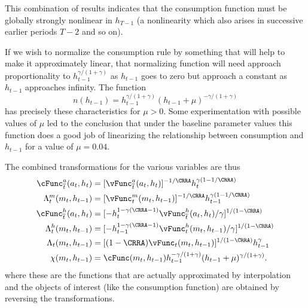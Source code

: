 \documentclass[titlepage, headings=optiontotocandhead]{\econtex}
\begin{document}
{  This combination of results indicates that the consumption function
  must be globally strongly nonlinear in $h_{T-1}$ (a nonlinearity which
  also arises in successive earlier periods $T-2$ and so on).

  If we wish to normalize the consumption rule by something that will
  help to make it approximately linear, that normalizing function will
  need approach proportionality to $h_{t-1}^{\gamma/(1+\gamma)}$ as
  $h_{t-1}$ goes to zero but approach a constant as $h_{t-1}$ approaches
  infinity.  The function
  \begin{equation}
    n(h_{t-1}) =
    h_{t-1}^{\gamma/(1+\gamma)}(h_{t-1}+\mu)^{-\gamma/(1+\gamma)}
  \end{equation}
  has precisely these characteristics for $\mu>0$.  Some
  experimentation with possible values of $\mu$ led to the conclusion
  that under the baseline parameter values this function does a good job
  of linearizing the relationship between consumption and $h_{t-1}$ for
  a value of $\mu = 0.04$.

  The combined transformations for the various variables are thus
  \begin{equation}\begin{gathered}\begin{aligned}
        \cFunc_{\overline{t}}^{{a}}({a}_{t},h_{t})        & = [\vEOPt^{{a}}({a}_{t},h_{t})]^{-1/\CRRA} h_{t}^{\gamma(1-1/\CRRA)} \label{eq:vEndstransform} \\
        \Lambda_{t}^{m}({m}_{t},h_{t-1})   & = [{\vFunc}_{t}^{m}({m}_{t},h_{t-1})]^{-1/\CRRA} h_{t-1}^{\gamma(1-1/\CRRA)} \label{eq:vxtransform} \\
        \cFunc_{\overline{t}}^{h}({a}_{t},h_{t})       
        & =                                                  [-h_{t}^{1-\gamma(\CRRA-1)}\vEOPt^{h}({a}_{t},h_{t})/\gamma]^{1/(1-\CRRA)}  \label{eq:vEndhtransform}
        \\      \Lambda_{t}^{h}({m}_{t},h_{t-1})   & = [-h_{t-1}^{1-\gamma(\CRRA-1)}{\vFunc}_{t}^{h}({m}_{t},h_{t-1})/\gamma]^{1/(1-\CRRA)} \label{eq:vhtransform}
        \\      \Lambda_{t}({m}_{t},h_{t-1})       & = [(1-\CRRA)
        {\vFunc}_{t}({m}_{t},h_{t-1})]^{1/(1-\CRRA)} h_{t-1}^{\gamma}\label{eq:vtransform}
        \\  \chi({m}_{t},h_{t-1})       & = \cFunc({m}_{t},h_{t-1})h_{t-1}^{-\gamma/(1+\gamma)}(h_{t-1}+\mu)^{\gamma/(1+\gamma)}.
      \end{aligned}\end{gathered}\end{equation}
  where these are the functions that are actually approximated by
  interpolation and the objects of interest (like the consumption
  function) are obtained by reversing the transformations.

}
\end{document}
